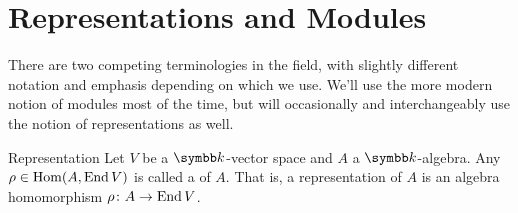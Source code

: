 \section{Representations and Modules}
\label{sec:representaitons and modules}
There are two competing terminologies in the field, with slightly different notation and emphasis depending on which we use.
We'll use the more modern notion of modules most of the time, but will occasionally and interchangeably use the notion of representations as well.

\begin{dfn}{Representation}{}
    Let \(V\) be a \(\field\)-vector space and \(A\) a \(\field\)-algebra.
    Any \(\rho \in \operatorname{Hom}(A, \operatorname{End} V)\) is called a  of \(A\).
    That is, a representation of \(A\) is an algebra homomorphism \(\rho \colon A \to \operatorname{End} V\).
\end{dfn}

